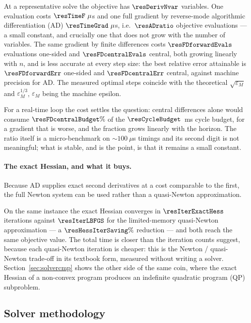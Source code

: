 \documentclass[11pt,a4paper]{article}
\begin{document}

At a representative solve the objective has $\resDerivNvar$ variables. One evaluation costs
$\resTimeF~\mu$s and one full gradient by reverse-mode algorithmic differentiation (AD) $\resTimeGrad~\mu$s,
i.e.\ $\resADratio$ objective evaluations --- a small constant, and crucially one that does not grow with the
number of variables. The same gradient by finite differences costs $\resFDforwardEvals$ evaluations one-sided
and $\resFDcentralEvals$ central, both growing linearly with $n$, and is less accurate at every step size:
the best relative error attainable is $\resFDforwardErr$ one-sided and $\resFDcentralErr$ central, against
machine precision for AD. The measured optimal steps coincide with the theoretical $\sqrt{\varepsilon_M}$ and
$\varepsilon_M^{1/3}$, $\varepsilon_M$ being the machine epsilon.

For a real-time loop the cost settles the question: central differences alone would consume
$\resFDcentralBudget\%$ of the $\resCycleBudget$~ms cycle budget, for a gradient that is worse, and the
fraction grows linearly with the horizon. The ratio itself is a micro-benchmark on
$\sim\!100~\mu$s timings and its second digit is not meaningful; what is stable, and is the point, is that it
remains a small constant.

\paragraph{The exact Hessian, and what it buys.} Because AD supplies exact second derivatives at a cost
comparable to the first, the full Newton system can be used rather than a quasi-Newton approximation.


On the same instance the exact Hessian converges in $\resIterExactHess$ iterations against $\resIterLBFGS$
for the limited-memory quasi-Newton approximation --- a $\resHessIterSaving\%$ reduction --- and both reach
the same objective value. The total time is closer than the iteration counts suggest, because each
quasi-Newton iteration is cheaper: this is the Newton / quasi-Newton trade-off in its textbook form,
measured without writing a solver. Section~\ref{sec:solvercmp} shows the other side of the same coin, where
the exact Hessian of a non-convex program produces an indefinite quadratic
program (QP) subproblem.

\subsection{Solver methodology}
\label{sec:solver}
\end{document}
